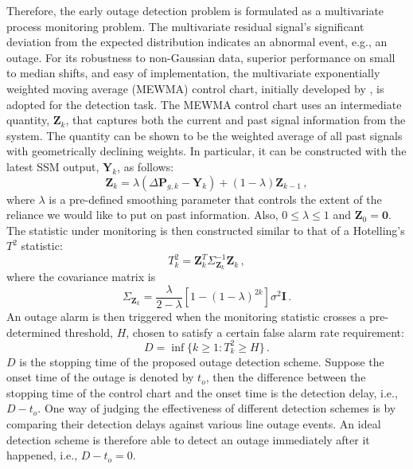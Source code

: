 Therefore, the early outage detection problem is formulated as a multivariate process monitoring problem. The multivariate residual signal's significant deviation from the expected distribution indicates an abnormal event, e.g., an outage. For its robustness to non-Gaussian data, superior performance on small to median shifts, and easy of implementation, the multivariate exponentially weighted moving average (MEWMA) control chart, initially developed by \cite{lowry1992multivariate}, is adopted for the detection task. The MEWMA control chart uses an intermediate quantity, $\boldsymbol{Z}_k$, that captures both the current and past signal information from the system. The quantity can be shown to be the weighted average of all past signals with geometrically declining weights. In particular, it can be constructed with the latest SSM output, $\boldsymbol{Y}_k$, as follows:
\begin{equation}
\label{ch4:eqn:ewma_z}
\boldsymbol{Z}_k = \lambda (\Delta\textbf{P}_{g, k} - \boldsymbol{Y}_{k}) + (1 - \lambda) \boldsymbol{Z}_{k-1} \,,
\end{equation}
where $\lambda$ is a pre-defined smoothing parameter that controls the extent of the reliance we would like to put on past information. Also, $0 \le \lambda \le 1$ and $\boldsymbol{Z}_0 = \mathbf{0}$. The statistic under monitoring is then constructed similar to that of a Hotelling's $T^2$ statistic:
\begin{equation}
\label{ch4:eqn:ewma_T}
T^2_k = \boldsymbol{Z}_k^T\Sigma_{\boldsymbol{Z}_k}^{-1}\boldsymbol{Z}_k \,,
\end{equation}
where the covariance matrix is 
$$
\Sigma_{\boldsymbol{Z}_k} = \frac{\lambda}{2 - \lambda}\left[1-(1-\lambda)^{2k}\right]\sigma^2\mathbf{I} \,.
$$
An outage alarm is then triggered when the monitoring statistic crosses a pre-determined threshold, $H$, chosen to satisfy a certain false alarm rate requirement:
\begin{equation}
\label{ch4:eqn:control_chart}
D = \inf\lbrace k\ge1 : T^2_k \ge H \rbrace \,.
\end{equation}
$D$ is the stopping time of the proposed outage detection scheme. Suppose the onset time of the outage is denoted by $t_o$, then the difference between the stopping time of the control chart and the onset time is the detection delay, i.e., $D - t_o$. One way of judging the effectiveness of different detection schemes is by comparing their detection delays against various line outage events. An ideal detection scheme is therefore able to detect an outage immediately after it happened, i.e., $D - t_o = 0$. 

